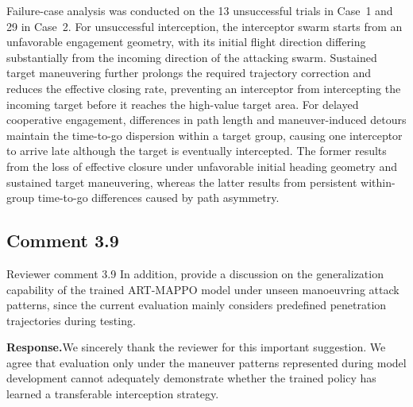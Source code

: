 \documentclass[11pt]{article}
\newcommand{\hladd}[1]{{\color{addblue}#1}}
\newcommand{\rsp}{\medskip\noindent\textbf{Response.}\quad}
\begin{document}
\begin{tcolorbox}[enhanced,breakable,colback=white,colframe=addblue!55,
coltext=addblue,fontupper=\color{addblue},boxrule=0.6pt,arc=2pt,
left=9pt,right=9pt,top=7pt,bottom=7pt]

\hladd{Failure-case analysis was conducted on the 13 unsuccessful trials in
Case~1 and 29 in Case~2. For unsuccessful interception, the interceptor
swarm starts from an unfavorable engagement geometry, with its initial flight
direction differing substantially from the incoming direction of the
attacking swarm. Sustained target maneuvering further prolongs the required
trajectory correction and reduces the effective closing rate, preventing an
interceptor from intercepting the incoming target before it reaches the
high-value target area. For delayed cooperative engagement, differences in
path length and maneuver-induced detours maintain the time-to-go dispersion
within a target group, causing one interceptor to arrive late although the
target is eventually intercepted. The former results from the loss of
effective closure under unfavorable initial heading geometry and sustained
target maneuvering, whereas the latter results from persistent within-group
time-to-go differences caused by path asymmetry.}
\end{tcolorbox}







\subsection*{Comment 3.9}

\begin{reviewercomment}{Reviewer comment 3.9}
In addition, provide a discussion on the generalization capability of the
trained ART-MAPPO model under unseen manoeuvring attack patterns, since the
current evaluation mainly considers predefined penetration trajectories
during testing.
\end{reviewercomment}

\rsp We sincerely thank the reviewer for this important suggestion. We agree
that evaluation only under the maneuver patterns represented during model
development cannot adequately demonstrate whether the trained policy has
learned a transferable interception strategy.
\end{document}
